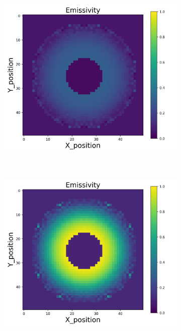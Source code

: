 {\begin{figure}[p]
\begin{minipage}{\textwidth}
\begin{subfigure}{0.325\textwidth}
        \end{subfigure}
        \begin{subfigure}{0.325\textwidth}
            \centering
            \includegraphics[width=\textwidth]{figures/raw_data/21/exp/emi_cal.jpg}
        \end{subfigure}
    \end{minipage}\\
    \begin{minipage}{\textwidth}
        \centering
        \begin{subfigure}{0.325\textwidth}
            \centering
            \includegraphics[width=\textwidth]{figures/raw_data/22/exp/emi_cal.jpg}

\end{subfigure}
\end{minipage}
\end{figure}}
